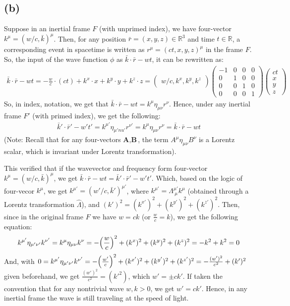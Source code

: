 \documentclass{article}
\newcommand{\RR}{\mathbb{R}}
\DeclarePairedDelimiter{\paran}{(}{)}%
\begin{document}
\subsection*{(b)}
Suppose in an inertial frame $F$ (with unprimed index), we have four-vector $k^\mu = (w/c, \bar{k})^\mu$. Then, for any position $\bar{r}=(x,y,z)\in\RR^3$ and time $t\in\RR$, a corresponding event in spacetime is written as $r^\mu = (ct, x,y,z)^\mu$ in the frame $F$. So, the input of the wave function $\phi$ as $\bar{k}\cdot \bar{r}-wt$, it can be rewritten as:
\begin{align}
    \bar{k}\cdot \bar{r}-wt = -\frac{w}{c}\cdot (ct)+k^x\cdot x+k^y\cdot y+k^z\cdot z = \begin{pmatrix}
        w/c, k^x, k^y, k^z
    \end{pmatrix}\begin{pmatrix}
        -1 &0&0&0\\0&1&0&0\\0&0&1&0\\0&0&0&1
    \end{pmatrix}\begin{pmatrix}
        ct\\x\\y\\z
    \end{pmatrix}
\end{align}
So, in index, notation, we get that $\bar{k}\cdot \bar{r}-wt = k^\mu \eta_{\mu\nu} r^\nu$. Hence, under any inertial frame $F'$ (with primed index), we get the following:
\begin{align}
    \bar{k}'\cdot \bar{r}'-w't' = k^{\mu'}\eta_{\mu'nu'}r^{\nu'} = k^\mu\eta_{\mu\nu}r^\nu = \bar{k}\cdot\bar{r}-wt
\end{align}
(Note: Recall that for any four-vectors $\textbf{A},\textbf{B}$, the term $A^\mu \eta_{\mu\nu}B^\nu$ is a Lorentz scalar, which is invariant under Lorentz transformation).

This verified that if the wavevector and frequency form four-vector $k^\mu =(w/c, \bar{k})^\mu$, we get $\bar{k}\cdot\bar{r}-wt = \bar{k}'\cdot \bar{r}'-w't'$. Which, based on the logic of four-vecor $k^\mu$, we get $k^{\mu'}=(w'/c, \bar{k}')^{\mu'}$, where $k^{\mu'} = \Lambda^{\mu'}_{\ \mu}k^\mu$ (obtained through a Lorentz transformation $\hat{\Lambda}$), and $(k')^2= (k^{x'})^2+(k^{y'})^2+(k^{z'})^2$. Then, since in the original frame $F$ we have $w=ck$ (or $\frac{w}{c}=k$), we get the following equation:
\begin{align}
    k^{\mu'}\eta_{\mu'\nu'}k^{\nu'}= k^\mu\eta_{\mu\nu}k^\nu = -\paran*{\frac{w}{c}}^2 + (k^x)^2+(k^y)^2+(k^z)^2 = -k^2+k^2 = 0
\end{align}
And, with $0=k^{\mu'}\eta_{\mu'\nu'}k^{\nu'} = -\paran*{\frac{w'}{c}}^2 + (k^{x'})^2+(k^{y'})^2+(k^{z'})^2 = -\frac{(w')^2}{c^2}+(k')^2$ given beforehand, we get $\frac{(w')^2}{c^2}=(k'^2)$, which $w' = \pm ck'$. If taken the convention that for any nontrivial wave $w, k> 0$, we get $w' = ck'$. Hence, in any inertial frame the wave is still traveling at the speed of light.
\end{document}
